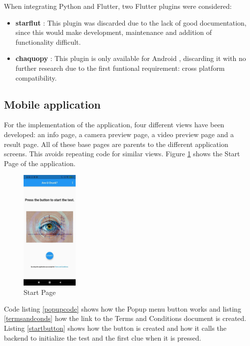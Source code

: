 When integrating Python and Flutter, two Flutter plugins were considered:

\begin{itemize}
  \item \textbf{starflut} \cite{starflut}: This plugin was discarded due to the lack of good documentation, since this would make development, maintenance and addition of functionality difficult.
  \item \textbf{chaquopy} \cite{chaquopy}: This plugin is only available for Android \cite{Android}, discarding it with no further research due to the first funtional requirement: cross platform compatibility.
\end{itemize}
\subsection{Mobile application}

For the implementation of the application, four different views have been developed: an info page, a camera preview page, a video preview page and a result page. All of these base pages are parents to the different application screens. This avoids repeating code for similar views. Figure \ref{startpage} shows the Start Page of the application.

\begin{figure}[H]
  \centering
  \includegraphics[width=0.25\textwidth]{./img/startpage.jpg}
  \caption{Start Page}
  \label{startpage}
\end{figure}

Code listing \ref{popupcode} shows how the Popup menu button works and listing \ref{termsandconds} how the link to the Terms and Conditions document is created. Listing \ref{startbutton} shows how the button is created and how it calls the backend to initialize the test and the first clue when it is pressed.


